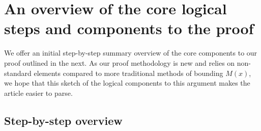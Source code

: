 \documentclass[11pt,reqno,a4letter]{article}
\numberwithin{figure}{section}
\numberwithin{table}{section}
\theoremstyle{plain}
\numberwithin{theorem}{section}
\theoremstyle{definition}
\begin{document}
\newpage
\section{An overview of the core logical steps and components to the proof} 

We offer an initial step-by-step summary overview of the core components 
to our proof outlined in the next. 
As our proof methodology is new and relies on non-standard elements compared to more 
traditional methods of bounding $M(x)$, we hope that this sketch of the logical components 
to this argument makes the article easier to parse. 

\subsection{Step-by-step overview} 
\end{document}
